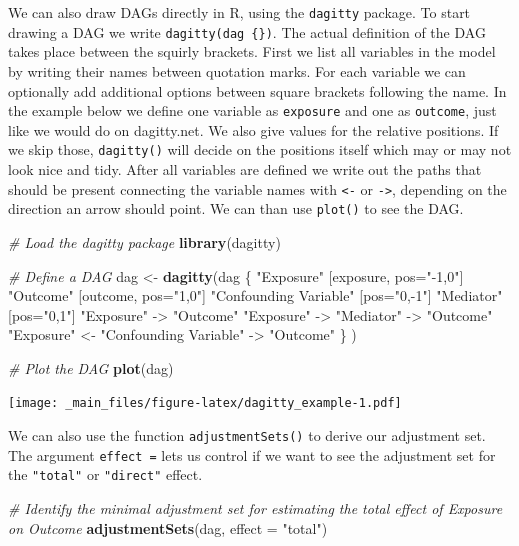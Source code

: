 \documentclass[
]{book}
\newenvironment{Shaded}{\begin{snugshade}}{\end{snugshade}}
\newcommand{\AttributeTok}[1]{\textcolor[rgb]{0.13,0.29,0.53}{#1}}
\newcommand{\CommentTok}[1]{\textcolor[rgb]{0.56,0.35,0.01}{\textit{#1}}}
\newcommand{\FunctionTok}[1]{\textcolor[rgb]{0.13,0.29,0.53}{\textbf{#1}}}
\newcommand{\NormalTok}[1]{#1}
\newcommand{\OtherTok}[1]{\textcolor[rgb]{0.56,0.35,0.01}{#1}}
\newcommand{\StringTok}[1]{\textcolor[rgb]{0.31,0.60,0.02}{#1}}
\begin{document}
We can also draw DAGs directly in R, using the \texttt{dagitty} package. To
start drawing a DAG we write \texttt{dagitty(\textquotesingle{}dag\ \{\})}. The actual definition
of the DAG takes place between the squirly brackets. First we list all
variables in the model by writing their names between quotation marks.
For each variable we can optionally add additional options between
square brackets following the name. In the example below we define one
variable as \texttt{exposure} and one as \texttt{outcome}, just like we would do on
dagitty.net. We also give values for the relative positions. If we skip
those, \texttt{dagitty()} will decide on the positions itself which may or may
not look nice and tidy. After all variables are defined we write out the
paths that should be present connecting the variable names with \texttt{\textless{}-} or
\texttt{-\textgreater{}}, depending on the direction an arrow should point. We can than use
\texttt{plot()} to see the DAG.

\begin{Shaded}
\begin{Highlighting}[]
\CommentTok{\# Load the dagitty package}
\FunctionTok{library}\NormalTok{(dagitty)}

\CommentTok{\# Define a DAG}
\NormalTok{dag }\OtherTok{\textless{}{-}} \FunctionTok{dagitty}\NormalTok{(}\StringTok{\textquotesingle{}dag \{}
\StringTok{  "Exposure" [exposure, pos="{-}1,0"]}
\StringTok{  "Outcome" [outcome, pos="1,0"]}
\StringTok{  "Confounding Variable" [pos="0,{-}1"] }
\StringTok{  "Mediator" [pos="0,1"]}
\StringTok{  "Exposure" {-}\textgreater{} "Outcome"}
\StringTok{  "Exposure" {-}\textgreater{} "Mediator" {-}\textgreater{} "Outcome"}
\StringTok{  "Exposure" \textless{}{-} "Confounding Variable" {-}\textgreater{} "Outcome"}
\StringTok{\}\textquotesingle{}}\NormalTok{ )}

\CommentTok{\# Plot the DAG}
\FunctionTok{plot}\NormalTok{(dag)}
\end{Highlighting}
\end{Shaded}

\texttt{[image: \_main\_files/figure-latex/dagitty\_example-1.pdf]}

We can also use the function \texttt{adjustmentSets()} to derive our adjustment
set. The argument \texttt{effect\ =} lets us control if we want to see the
adjustment set for the \texttt{"total"} or \texttt{"direct"} effect.

\begin{Shaded}
\begin{Highlighting}[]
\CommentTok{\# Identify the minimal adjustment set for estimating the total effect of Exposure on Outcome}
\FunctionTok{adjustmentSets}\NormalTok{(dag, }\AttributeTok{effect =} \StringTok{"total"}\NormalTok{)}
\end{Highlighting}
\end{Shaded}
\end{document}
